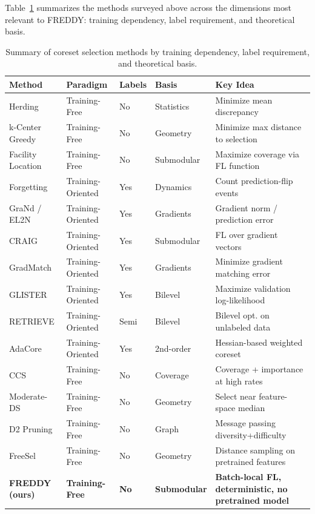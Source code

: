 \documentclass{article}
\begin{document}
Table~\ref{tab:coreset_methods} summarizes the methods surveyed above across the dimensions most relevant to FREDDY: training dependency, label requirement, and theoretical basis.

\begin{table}[h!]
\centering
\caption{Summary of coreset selection methods by training dependency, label requirement, and theoretical basis.}
\label{tab:coreset_methods}
\begin{tabular}{p{2.8cm} p{2.2cm} p{1.6cm} p{1.5cm} p{5cm}}
\toprule
\textbf{Method} & \textbf{Paradigm} & \textbf{Labels} & \textbf{Basis} & \textbf{Key Idea} \\
\midrule
Herding \cite{Welling2009Herding} & Training-Free & No & Statistics & Minimize mean discrepancy \\
k-Center Greedy \cite{Sener2018ActiveLearning} & Training-Free & No & Geometry & Minimize max distance to selection \\
Facility Location \cite{Wei2015Submodularity} & Training-Free & No & Submodular & Maximize coverage via FL function \\
Forgetting \cite{Toneva2019Forgetting} & Training-Oriented & Yes & Dynamics & Count prediction-flip events \\
GraNd / EL2N \cite{Paul2021Deep} & Training-Oriented & Yes & Gradients & Gradient norm / prediction error \\
CRAIG \cite{Mirzasoleiman2020Coresets} & Training-Oriented & Yes & Submodular & FL over gradient vectors \\
GradMatch \cite{Killamsetty2021GradMatch} & Training-Oriented & Yes & Gradients & Minimize gradient matching error \\
GLISTER \cite{killamsetty2021glister} & Training-Oriented & Yes & Bilevel & Maximize validation log-likelihood \\
RETRIEVE \cite{Killamsetty2021Retrieve} & Training-Oriented & Semi & Bilevel & Bilevel opt. on unlabeled data \\
AdaCore \cite{Pooladzandi2022AdaCore} & Training-Oriented & Yes & 2nd-order & Hessian-based weighted coreset \\
CCS \cite{Zheng2023CCS} & Training-Free & No & Coverage & Coverage + importance at high rates \\
Moderate-DS \cite{Xia2023Moderate} & Training-Free & No & Geometry & Select near feature-space median \\
D2 Pruning \cite{Maharana2024D2} & Training-Free & No & Graph & Message passing diversity+difficulty \\
FreeSel \cite{Xie2023FreeSel} & Training-Free & No & Geometry & Distance sampling on pretrained features \\
\midrule
\textbf{FREDDY (ours)} & \textbf{Training-Free} & \textbf{No} & \textbf{Submodular} & \textbf{Batch-local FL, deterministic, no pretrained model} \\
\bottomrule
\end{tabular}
\end{table}
\end{document}
